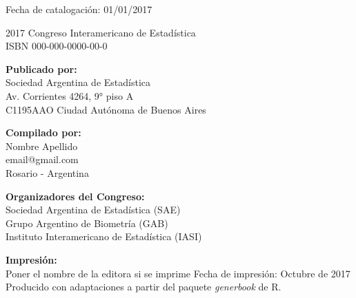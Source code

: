 \newpage
\thispagestyle{empty}



\bigbreak
\footnotesize Fecha de catalogación: 01/01/2017

\vfill

\small{
\textcopyright{} 2017 Congreso Interamericano de Estadística \\
ISBN 000-000-0000-00-0

\bigbreak
\textbf {Publicado por:} \\
Sociedad Argentina de Estadística \\
Av. Corrientes 4264, 9° piso A \\
C1195AAO Ciudad Autónoma de Buenos Aires

\bigbreak
\textbf {Compilado por:}\\
Nombre Apellido \\
email@gmail.com \\
Rosario - Argentina

\bigbreak
\textbf {Organizadores del Congreso:} \\
Sociedad Argentina de Estadística (SAE) \\
Grupo Argentino de Biometría (GAB) \\
Instituto Interamericano de Estadística (IASI)

\bigbreak
\textbf {Impresión:} \\
Poner el nombre de la editora si se imprime
\bigbreak
Fecha de impresión: Octubre de 2017 \\
Producido con adaptaciones a partir del paquete \textit{generbook} de R.
}



